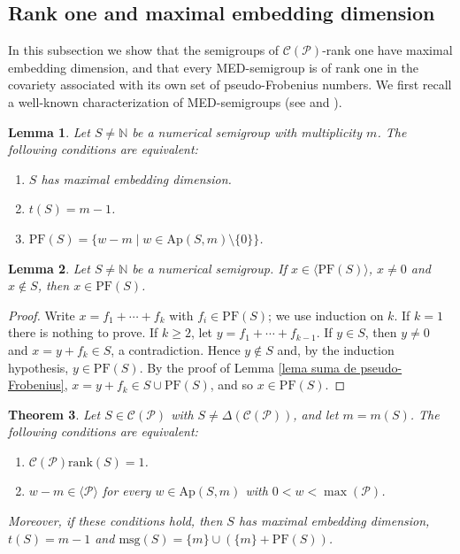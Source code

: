 \documentclass[11pt]{article}
\def\N{\mathbb{N}}
\newtheorem{theorem}{Theorem}[section]
\newtheorem{lemma}[theorem]{Lemma}
\numberwithin{equation}{section}
\newcommand{\CP}{\mathcal C(\mathcal P)}
\newcommand{\rk}{\mathrm{rank}}
\newcommand{\Ap}{\mathrm{Ap}}
\newcommand{\PF}{\mathrm{PF}}
\newcommand{\msg}{\mathrm{msg}}
\begin{document}
\subsection{Rank one and maximal embedding dimension}\label{subsec:MED}

In this subsection we show that the semigroups of $\CP$-rank one have maximal embedding dimension, and that every MED-semigroup is of rank one in the covariety associated with its own set of pseudo-Frobenius numbers. We first recall a well-known characterization of MED-semigroups (see \cite[Chapter 2]{libro} and \cite{med}).

\begin{lemma}\label{lema MED tipo}
Let $S\neq\N$ be a numerical semigroup with multiplicity $m$. The following conditions are equivalent:
\begin{enumerate}
\item $S$ has maximal embedding dimension.
\item $t(S)=m-1$.
\item $\PF(S)=\{w-m\mid w\in\Ap(S,m)\setminus\{0\}\}$.
\end{enumerate}
\end{lemma}

\begin{lemma}\label{lema sumas de PF}
Let $S\neq\N$ be a numerical semigroup. If $x\in\langle\PF(S)\rangle$, $x\neq0$ and $x\notin S$, then $x\in\PF(S)$.
\end{lemma}

\begin{proof}
Write $x=f_1+\cdots+f_k$ with $f_i\in\PF(S)$; we use induction on $k$. If $k=1$ there is nothing to prove. If $k\geq 2$, let $y=f_1+\cdots+f_{k-1}$. If $y\in S$, then $y\neq0$ and $x=y+f_k\in S$, a contradiction. Hence $y\notin S$ and, by the induction hypothesis, $y\in\PF(S)$. By the proof of Lemma \ref{lema suma de pseudo-Frobenius}, $x=y+f_k\in S\cup\PF(S)$, and so $x\in\PF(S)$.
\end{proof}

\begin{theorem}\label{teorema MED}
Let $S\in\CP$ with $S\neq\Delta(\CP)$, and let $m=m(S)$. The following conditions are equivalent:
\begin{enumerate}
\item $\CP\rk(S)=1$.
\item $w-m\in\langle\mathcal P\rangle$ for every $w\in\Ap(S,m)$ with $0<w<\max(\mathcal P)$.
\end{enumerate}
Moreover, if these conditions hold, then $S$ has maximal embedding dimension, $t(S)=m-1$ and $\msg(S)=\{m\}\cup(\{m\}+\PF(S))$.
\end{theorem}
\end{document}
